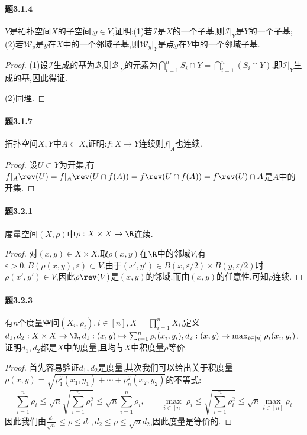 \documentclass{article}
\begin{document}
\paragraph{题3.1.4}$Y$是拓扑空间$X$的子空间,$y\in Y$,证明:(1)若$\mathscr{I}$是$X$的一个子基,则$\mathscr{I}|_Y$是$Y$的一个子基;(2)若$\mathscr{W}_y$是$y$在$X$中的一个邻域子基,则$\mathscr{W}_y|_Y$是点$y$在$Y$中的一个邻域子基.
\begin{proof}
    (1)设$\mathscr{I}$生成的基为$\mathscr{B}$,则$\mathscr{B}|_Y$的元素为$\bigcap_{i=1}^n S_i\cap Y=\bigcap_{i=1}^n (S_i\cap Y)$,即$\mathscr{I}|_Y$生成的基,因此得证.

    (2)同理.
\end{proof}

\paragraph{题3.1.7}拓扑空间$X,Y$中$A\subset X$,证明:$f:X\to Y$连续则$f|_A$也连续.
\begin{proof}
    设$U\subset Y$为开集,有$f|_A\rev(U)=f|_A\rev(U\cap f(A))=f\rev(U\cap f(A))=f\rev(U)\cap A$是$A$中的开集.
\end{proof}

\paragraph{题3.2.1}度量空间$(X,\rho)$中$\rho:X\times X\to\R$连续.
\begin{proof}
    对$(x,y)\in X\times X$,取$\rho(x,y)$在$\R$中的邻域$V$,有$\varepsilon>0, B(\rho(x,y),\varepsilon)\subset V$.由于$(x',y')\in B(x,\varepsilon/2)\times B(y,\varepsilon/2)$时$\rho(x',y')\in V$,因此$\rho\rev(V)$是$(x,y)$的邻域.而由$(x,y)$的任意性,可知$\rho$连续.
\end{proof}

\paragraph{题3.2.3}有$n$个度量空间$(X_i,\rho_i), i\in [n], X=\prod_{i=1}^n X_i$,定义$d_1,d_2:X\times X\to \R, d_1:(x,y)\mapsto \sum_{i=1}^{n}\rho_i(x_i,y_i), d_2:(x,y)\mapsto \max_{i\in [n]}\rho_i(x_i,y_i)$.证明$d_1,d_2$都是$X$中的度量,且均与$X$中积度量$\rho$等价.
\begin{proof}
    首先容易验证$d_1,d_2$是度量,其次我们可以给出关于积度量$\rho(x,y)=\sqrt{\rho_1^2(x_1,y_1)+\cdots+\rho_n^2(x_2,y_2)}$的不等式:
    $$\sum_{i=1}^n \rho_i\leq \sqrt{n}\sqrt{\sum_{i=1}^n \rho_i^2}\leq \sqrt{n}\sum_{i=1}^n \rho_i,\qquad \max_{i\in [n]} \rho_i\leq \sqrt{\sum_{i=1}^n \rho_i^2}\leq \sqrt{n}\max_{i\in [n]}\rho_i$$
    因此我们由$\frac{d_1}{\sqrt{n}}\leq \rho\leq d_1, d_2\leq \rho\leq \sqrt{n}d_2$,因此度量是等价的.
\end{proof}
\end{document}
